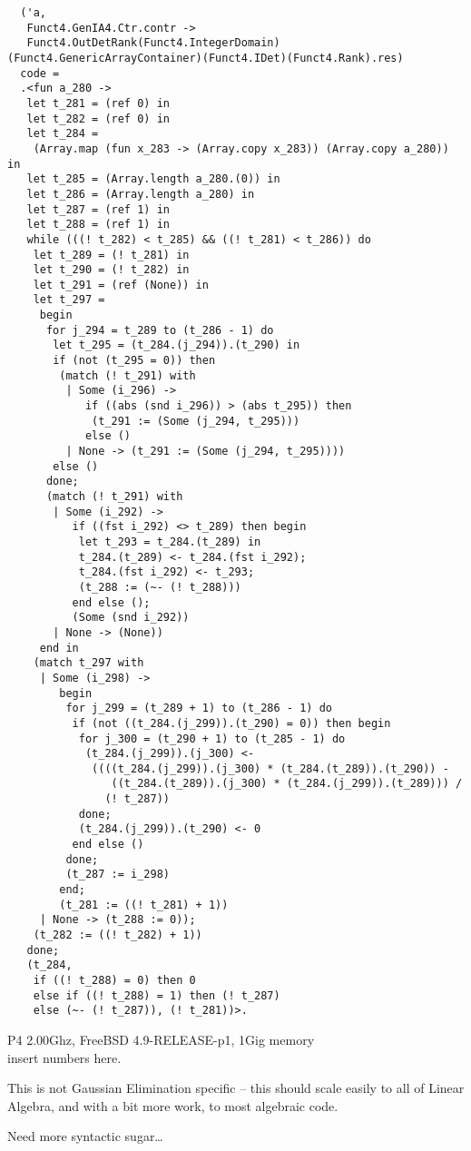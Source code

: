 \documentclass[landscape]{slides}
\begin{document}
\begin{slide}
\begin{small}
\begin{verbatim}
  ('a,
   Funct4.GenIA4.Ctr.contr ->
   Funct4.OutDetRank(Funct4.IntegerDomain)(Funct4.GenericArrayContainer)(Funct4.IDet)(Funct4.Rank).res)
  code =
  .<fun a_280 ->
   let t_281 = (ref 0) in
   let t_282 = (ref 0) in
   let t_284 =
    (Array.map (fun x_283 -> (Array.copy x_283)) (Array.copy a_280)) in
   let t_285 = (Array.length a_280.(0)) in
   let t_286 = (Array.length a_280) in
   let t_287 = (ref 1) in
   let t_288 = (ref 1) in
   while (((! t_282) < t_285) && ((! t_281) < t_286)) do
    let t_289 = (! t_281) in
    let t_290 = (! t_282) in
    let t_291 = (ref (None)) in
    let t_297 =
     begin
      for j_294 = t_289 to (t_286 - 1) do
       let t_295 = (t_284.(j_294)).(t_290) in
       if (not (t_295 = 0)) then
        (match (! t_291) with
         | Some (i_296) ->
            if ((abs (snd i_296)) > (abs t_295)) then
             (t_291 := (Some (j_294, t_295)))
            else ()
         | None -> (t_291 := (Some (j_294, t_295))))
       else ()
      done;
      (match (! t_291) with
       | Some (i_292) ->
          if ((fst i_292) <> t_289) then begin
           let t_293 = t_284.(t_289) in
           t_284.(t_289) <- t_284.(fst i_292);
           t_284.(fst i_292) <- t_293;
           (t_288 := (~- (! t_288)))
          end else ();
          (Some (snd i_292))
       | None -> (None))
     end in
    (match t_297 with
     | Some (i_298) ->
        begin
         for j_299 = (t_289 + 1) to (t_286 - 1) do
          if (not ((t_284.(j_299)).(t_290) = 0)) then begin
           for j_300 = (t_290 + 1) to (t_285 - 1) do
            (t_284.(j_299)).(j_300) <-
             ((((t_284.(j_299)).(j_300) * (t_284.(t_289)).(t_290)) -
                ((t_284.(t_289)).(j_300) * (t_284.(j_299)).(t_289))) /
               (! t_287))
           done;
           (t_284.(j_299)).(t_290) <- 0
          end else ()
         done;
         (t_287 := i_298)
        end;
        (t_281 := ((! t_281) + 1))
     | None -> (t_288 := 0));
    (t_282 := ((! t_282) + 1))
   done;
   (t_284,
    if ((! t_288) = 0) then 0
    else if ((! t_288) = 1) then (! t_287)
    else (~- (! t_287)), (! t_281))>.
\end{verbatim}
\end{small}
\end{slide}

\begin{slide}
	P4 2.00Ghz, FreeBSD 4.9-RELEASE-p1, 1Gig memory\\
	insert numbers here.
\end{slide}

\begin{slide}
    This is not Gaussian Elimination specific -- this should scale
    easily to all of Linear Algebra, and with a bit more work, to
    most algebraic code.

    Need more syntactic sugar\dots
\end{slide}
\end{document}
